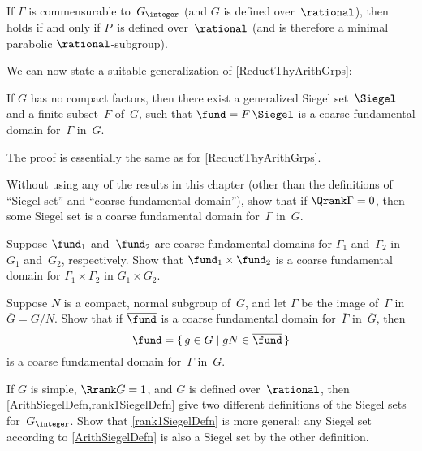 \begin{rem} \label{Rank1NLattIffQ}
If $\Gamma$ is commensurable to~$G_\integer$ (and $G$ is defined over~$\rational$), then  holds if and only if $P$~is defined over~$\rational$ (and is therefore a minimal parabolic $\rational$-subgroup).
\end{rem}

We can now state a suitable generalization of \cref{ReductThyArithGrps}:

\begin{thm} \label{ReductThyNonarith}
If $G$ has no compact factors, then there exist a generalized Siegel set\/~$\Siegel$ and a finite subset~$F$ of~$G$, such that $\fund = F \, \Siegel$ is a coarse fundamental domain for\/~$\Gamma$ in~$G$.
\end{thm}

The proof is essentially the same as for \cref{ReductThyArithGrps}.

\begin{exercises}

\item \label{GZCpctSiegel=G}
Without using any of the results in this chapter (other than the definitions of ``Siegel set'' and ``coarse fundamental domain''), show that if $\Qrank \Gamma = 0$, then some Siegel set is a coarse fundamental domain for~$\Gamma$ in~$G$.

\item Suppose $\fund_1$ and~$\fund_2$ are coarse fundamental domains for $\Gamma_1$ and~$\Gamma_2$ in $G_1$ and~$G_2$, respectively. Show that $\fund_1 \times \fund_2$ is a coarse fundamental domain for $\Gamma_1 \times \Gamma_2$ in $G_1 \times G_2$.

\item Suppose $N$ is a compact, normal subgroup of~$G$, and let $\overline{\Gamma}$ be the image of~$\Gamma$ in $\overline{G} = G/N$. Show that if $\overline{\fund}$ is a coarse fundamental domain for~$\overline{\Gamma}$ in~$\overline{G}$, then 
	$$ \fund = \{\, g \in G \mid gN \in \overline{\fund} \,\} $$
is a coarse fundamental domain for~$\Gamma$ in~$G$.

\item If $G$ is simple, $\Rrank G = 1$, and $G$ is defined over~$\rational$, then \cref{ArithSiegelDefn,rank1SiegelDefn} give two different definitions of the Siegel sets for~$G_\integer$. Show that \cref{rank1SiegelDefn} is more general: any Siegel set according to \cref{ArithSiegelDefn} is also a Siegel set by the other definition.

\end{exercises}











